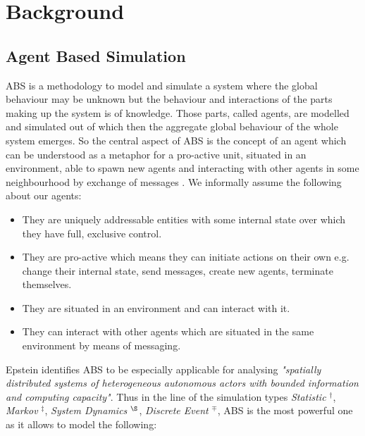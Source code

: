 \section{Background}

\subsection{Agent Based Simulation}
ABS is a methodology to model and simulate a system where the global behaviour may be unknown but the behaviour and interactions of the parts making up the system is of knowledge. Those parts, called agents, are modelled and simulated out of which then the aggregate global behaviour of the whole system emerges. So the central aspect of ABS is the concept of an agent which can be understood as a metaphor for a pro-active unit, situated in an environment, able to spawn new agents and interacting with other agents in some neighbourhood by exchange of messages \cite{wooldridge_introduction_2009}. We informally assume the following about our agents:

\begin{itemize}
	\item They are uniquely addressable entities with some internal state over which they have full, exclusive control.
	\item They are pro-active which means they can initiate actions on their own e.g. change their internal state, send messages, create new agents, terminate themselves.
	\item They are situated in an environment and can interact with it.
	\item They can interact with other agents which are situated in the same environment by means of messaging.
\end{itemize} 

Epstein \cite{epstein_generative_2012} identifies ABS to be especially applicable for analysing \textit{"spatially distributed systems of heterogeneous autonomous actors with bounded information and computing capacity"}. Thus in the line of the simulation types \textit{Statistic} $^\dag$, \textit{Markov} $^\ddag$, \textit{System Dynamics} $^\S$, \textit{Discrete Event} $^\mp$, ABS is the most powerful one as it allows to model  the following:

